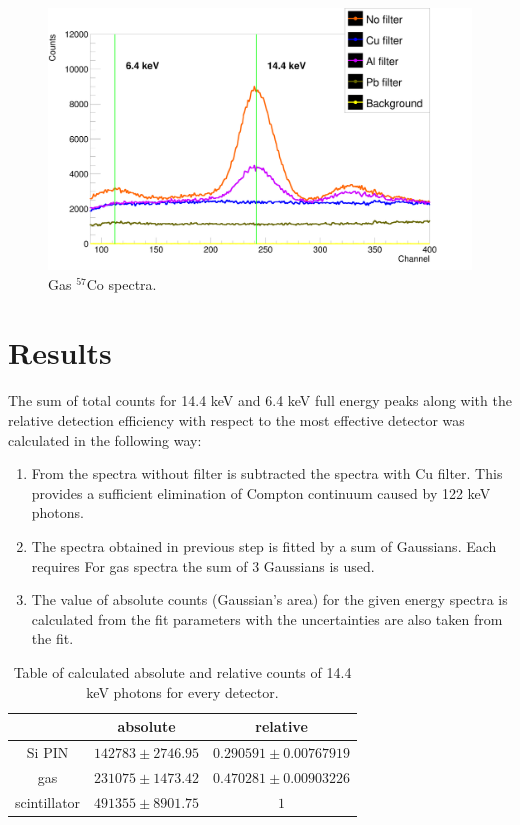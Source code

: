 \begin{figure}[H]
\centering
\includegraphics[scale=0.125, angle = 0]{./pictures/GasSpectre.png}
\caption{Gas $^{57}$Co spectra.}
\label{Gas detector spectra.}

\end{figure}

\section{Results}
The sum of total counts for 14.4 keV and 6.4 keV full energy peaks along with the relative detection efficiency with respect to the most effective detector was calculated in the following way:

\begin{enumerate}
\item From the spectra without filter is subtracted the spectra with Cu filter. This provides a sufficient elimination of Compton continuum caused by 122 keV photons. 
\item The spectra obtained in previous step is fitted by a sum of Gaussians. Each requires For gas spectra the sum of 3 Gaussians is used.
\item The value of absolute counts (Gaussian's area) for the given energy spectra is calculated from the fit parameters with the uncertainties are also taken from the fit.
\end{enumerate}




\begin{table}[H]
\centering
\begin{tabular}{|c|c|c|}
\hline
   & absolute & relative \\ \hline
Si PIN & $142783 \pm 2746.95$    & $0.290591 \pm 0.00767919$  \\ \hline
gas & $231075 \pm 1473.42$    & $0.470281 \pm  0.00903226$ \\ \hline
scintillator  & $491355 \pm 8901.75$    & $1$ \\ \hline
\end{tabular}
\caption{Table of calculated absolute and relative counts of 14.4 keV photons for every detector.}
 \label{144kevEFF}
\end{table}


